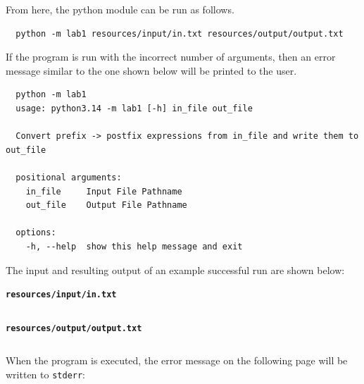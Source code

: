 \documentclass[10pt,letterpaper,final]{report}
\begin{document}
\noindent From here, the python module can be run as follows.

  {\small
    \begin{verbatim}
  python -m lab1 resources/input/in.txt resources/output/output.txt
\end{verbatim}
  }

\noindent If the program is run with the incorrect number of arguments, then an error message similar to the one shown below will be printed to the user.

  {\small
    \begin{verbatim}
  python -m lab1
  usage: python3.14 -m lab1 [-h] in_file out_file

  Convert prefix -> postfix expressions from in_file and write them to out_file

  positional arguments:
    in_file     Input File Pathname
    out_file    Output File Pathname

  options:
    -h, --help  show this help message and exit
\end{verbatim}
  }

\noindent The input and resulting output of an example successful run are shown below:

\begin{center}
  \begin{minipage}[t]{0.2\textwidth}
    \centering
    \textbf{\texttt{resources/input/in.txt}}\\
    \inputminted[frame=single,fontsize=\footnotesize]{text}{resources/input/in.txt}
  \end{minipage}\hfill
  \begin{minipage}[t]{0.76\textwidth}
    \centering
    \textbf{\texttt{resources/output/output.txt}}\\
    \inputminted[frame=single,fontsize=\footnotesize]{text}{resources/output/output.txt}
  \end{minipage}
\end{center}

\noindent When the program is executed, the error message on the following page will be written to \texttt{stderr}:

\pagebreak
\end{document}
